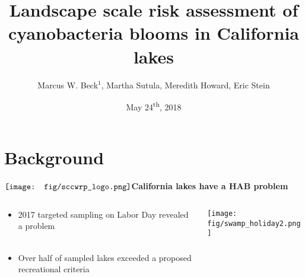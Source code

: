 \documentclass[serif]{beamer}\usepackage[]{graphicx}\usepackage[]{color}
\begin{document}
\title[Risk assessment for CA lakes]{\textbf{Landscape scale risk assessment of cyanobacteria blooms in California lakes}}
\author[Beck et al.]{Marcus W. Beck$^1$, Martha Sutula, Meredith Howard, Eric Stein}


\date{May 24\textsuperscript{th}, 2018}


\begin{frame}[shrink]
\vspace{0.2in}
\titlepage
\end{frame}

\section{Background}

\begin{frame}{{$\vcenter{\hbox{\texttt{[image: fig/sccwrp\_logo.png]}}}$\hspace{0.07in}\textbf{California lakes have a HAB problem}}}
\begin{columns}
\begin{column}{0.4\textwidth}
\begin{itemize}
\item 2017 targeted sampling on Labor Day revealed a problem \\~\\
\item Over half of sampled lakes exceeded a proposed recreational criteria
\end{itemize}
\end{column}
\begin{column}{0.6\textwidth}
\centerline{\texttt{[image: fig/swamp\_holiday2.png]}}
\end{column}
\end{columns}
\end{frame}
\end{document}
